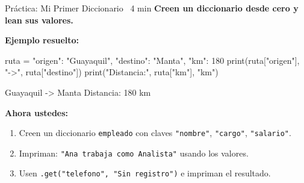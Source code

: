 \documentclass[aspectratio=169, 11pt]{beamer}
\begin{document}
\begin{frame}[fragile,shrink=30]{Práctica: Mi Primer Diccionario \hfill
    {\normalsize\color{arcaRed}\faClock\ 4 min}}
  \vspace{-6pt}
  {\small\color{arcaDark}\bfseries
    Creen un diccionario desde cero y lean sus valores.}

  \vspace{4pt}
  {\footnotesize\color{arcaDark}\bfseries Ejemplo resuelto:}
  \vspace{2pt}
  \begin{pyblock}
ruta = {"origen": "Guayaquil", "destino": "Manta", "km": 180}
print(ruta["origen"], "->", ruta["destino"])
print("Distancia:", ruta["km"], "km")
  \end{pyblock}
  \vspace{-2pt}
  \begin{outputblock}
Guayaquil -> Manta
Distancia: 180 km
  \end{outputblock}

  \vspace{4pt}
  {\footnotesize\color{arcaDark}\bfseries Ahora ustedes:}
  {\footnotesize
  \begin{enumerate}\setlength{\itemsep}{3pt}
    \item Creen un diccionario \texttt{empleado} con claves
          \texttt{"nombre"}, \texttt{"cargo"}, \texttt{"salario"}.
    \item Impriman: \texttt{"Ana trabaja como Analista"} usando los valores.
    \item Usen \texttt{.get("telefono", "Sin registro")} e impriman el resultado.
  \end{enumerate}
  }
\end{frame}
\end{document}
